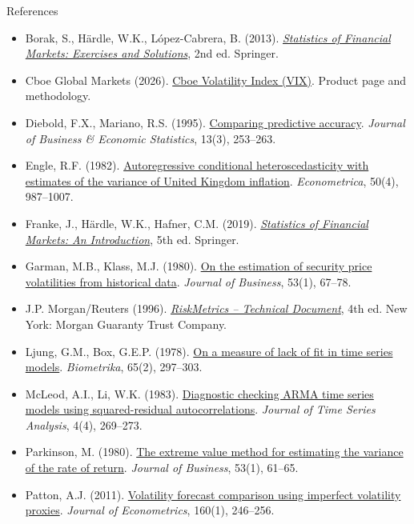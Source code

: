 \begin{frame}{References}
\itemsize{\tiny}
\begin{itemize}
    \item Borak, S., Härdle, W.K., López-Cabrera, B. (2013). \href{https://doi.org/10.1007/978-3-642-33929-5}{\textit{Statistics of Financial Markets: Exercises and Solutions}}, 2nd ed. Springer.
    \item Cboe Global Markets (2026). \href{https://www.cboe.com/tradable_products/vix/}{Cboe Volatility Index (VIX)}. Product page and methodology.
    \item Diebold, F.X., Mariano, R.S. (1995). \href{https://doi.org/10.1080/07350015.1995.10524599}{Comparing predictive accuracy}. \textit{Journal of Business \& Economic Statistics}, 13(3), 253--263.
    \item Engle, R.F. (1982). \href{https://doi.org/10.2307/1912773}{Autoregressive conditional heteroscedasticity with estimates of the variance of United Kingdom inflation}. \textit{Econometrica}, 50(4), 987--1007.
    \item Franke, J., Härdle, W.K., Hafner, C.M. (2019). \href{https://doi.org/10.1007/978-3-030-13751-9}{\textit{Statistics of Financial Markets: An Introduction}}, 5th ed. Springer.
    \item Garman, M.B., Klass, M.J. (1980). \href{https://doi.org/10.1086/296072}{On the estimation of security price volatilities from historical data}. \textit{Journal of Business}, 53(1), 67--78.
    \item J.P. Morgan/Reuters (1996). \href{https://www.msci.com/documents/10199/5915b101-4206-4ba0-aee2-3449d5c7e95a}{\textit{RiskMetrics -- Technical Document}}, 4th ed. New York: Morgan Guaranty Trust Company.
    \item Ljung, G.M., Box, G.E.P. (1978). \href{https://doi.org/10.1093/biomet/65.2.297}{On a measure of lack of fit in time series models}. \textit{Biometrika}, 65(2), 297--303.
    \item McLeod, A.I., Li, W.K. (1983). \href{https://doi.org/10.1111/j.1467-9892.1983.tb00373.x}{Diagnostic checking ARMA time series models using squared-residual autocorrelations}. \textit{Journal of Time Series Analysis}, 4(4), 269--273.
    \item Parkinson, M. (1980). \href{https://doi.org/10.1086/296071}{The extreme value method for estimating the variance of the rate of return}. \textit{Journal of Business}, 53(1), 61--65.
    \item Patton, A.J. (2011). \href{https://doi.org/10.1016/j.jeconom.2010.03.034}{Volatility forecast comparison using imperfect volatility proxies}. \textit{Journal of Econometrics}, 160(1), 246--256.

\end{itemize}
\end{frame}

